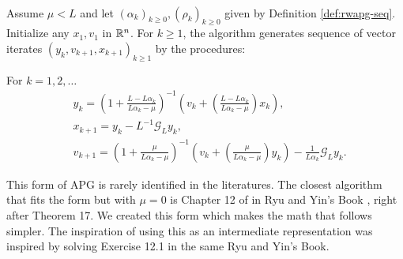 \documentclass[12pt]{article}
\begin{document}
        \begin{definition}\label{def:r-wapg-intermediate}\;\\
            Assume $\mu < L$ and let $(\alpha_k)_{k \ge 0}, (\rho_k)_{k \ge 0}$ given by Definition \ref{def:rwapg-seq}. 
            Initialize any $x_1, v_1$ in $\mathbb R^n$. 
            For $k \ge 1$, the algorithm generates sequence of vector iterates $(y_{k}, v_{k + 1}, x_{k + 1})_{k \ge 1}$ by the procedures: 
            \begin{tcolorbox}
                For $k = 1, 2, \ldots$
                \begin{align*} 
                    & y_{k} = 
                    \left(
                        1 + \frac{L - L\alpha_{k}}{L\alpha_{k} - \mu}
                    \right)^{-1}
                    \left(
                        v_{k} + 
                        \left(\frac{L - L\alpha_{k}}{L\alpha_{k} - \mu} \right) x_{k}
                    \right), 
                    \\
                    & x_{k + 1} = 
                    y_k - L^{-1} \mathcal G_L y_k, 
                    \\
                    & v_{k + 1} = 
                    \left(
                        1 + \frac{\mu}{L \alpha_k - \mu}
                    \right)^{-1}
                    \left(
                        v_k + 
                        \left(\frac{\mu}{L \alpha_k - \mu}\right) y_k
                    \right) - \frac{1}{L\alpha_{k}}\mathcal G_L y_k. 
                \end{align*}
            \end{tcolorbox}
        \end{definition}
        \begin{remark}
            This form of APG is rarely identified in the literatures. 
            The closest algorithm that fits the form but with $\mu = 0$ is Chapter 12 of in Ryu and Yin's Book \cite{ryu_large-scale_2022}, right after Theorem 17. 
            We created this form which makes the math that follows simpler. 
            The inspiration of using this as an intermediate representation was inspired by solving Exercise 12.1 in the same Ryu and Yin's Book. 
        \end{remark}
\end{document}
